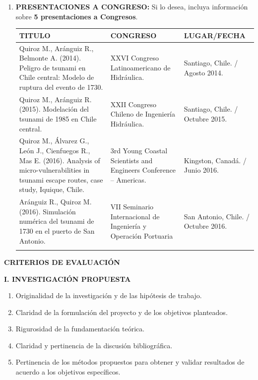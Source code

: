 \documentclass[11pt,letterpaper]{article}
\begin{document}
\begin{enumerate}
\item \textbf{PRESENTACIONES A CONGRESO:} Si lo desea, incluya información sobre \textbf{5 presentaciones a Congresos}. \\
\begin{table}[h]
\sffamily\footnotesize
\tabulinesep=6pt
\arrayrulewidth=1pt
\begin{tabu}{| X[lm] | X[lm]| X[lm] |}
\hline
{}\color{white}\textbf{TITULO} & \color{white}\textbf{CONGRESO} &      \color{white}\textbf{LUGAR/FECHA} \\ \hline
Quiroz M., Aránguiz R., Belmonte A. (2014). Peligro de tsunami en Chile central: Modelo de
ruptura del evento de 1730. & XXVI Congreso Latinoamericano de Hidráulica.  & Santiago, Chile. / Agosto 2014. \\ \hline  
Quiroz M., Aránguiz R. (2015). Modelación del tsunami de 1985 en Chile central. & XXII
Congreso Chileno de Ingeniería Hidráulica. & Santiago, Chile. / Octubre 2015.   \\ \hline        
Quiroz M., Álvarez G., León J., Cienfuegos R., Mas E. (2016). Analysis of micro-vulnerabilities in tsunami escape routes, case study, Iquique, Chile. & 3rd Young Coastal Scientists and
Engineers Conference – Americas. & Kingston, Canadá. / Junio 2016. \\ \hline
Aránguiz R., Quiroz M. (2016). Simulación numérica del tsunami de 1730 en el puerto de San Antonio. & VII Seminario Internacional de Ingeniería y Operación Portuaria  &  San Antonio, Chile. / Octubre 2016. \\ \hline
  &   &  \\ \hline
\end{tabu}
\end{table}
\end{enumerate}
\newpage

\vspace*{10mm}

\begin{center}
\textbf{CRITERIOS DE EVALUACIÓN}
\end{center} 
\vspace{5mm}

\textbf{I. INVESTIGACIÓN PROPUESTA}

\begin{enumerate}
\item Originalidad de la investigación y de las hipótesis de trabajo.
\item Claridad de la formulación del proyecto y de los objetivos planteados. 
\item Rigurosidad de la fundamentación teórica.
\item Claridad y pertinencia de la discusión bibliográfica.
\item Pertinencia de los métodos propuestos para obtener y validar resultados de acuerdo a los objetivos específicos.
\end{enumerate}
\end{document}

